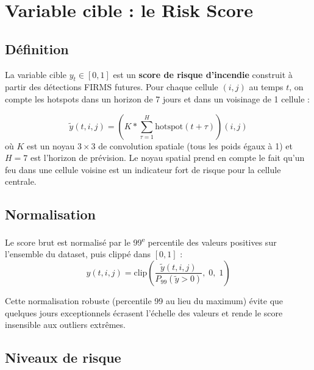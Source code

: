 \documentclass[12pt,a4paper]{report}
\begin{document}
\section{Variable cible : le Risk Score}

\subsection{Définition}

La variable cible $y_t \in [0, 1]$ est un \textbf{score de risque d'incendie} construit
à partir des détections FIRMS futures. Pour chaque cellule $(i, j)$ au temps $t$, on
compte les hotspots dans un horizon de 7 jours et dans un voisinage de 1 cellule :

\begin{equation}
  \tilde{y}(t, i, j) = \left(K * \sum_{\tau=1}^{H} \text{hotspot}(t+\tau)\right)(i, j)
  \label{eq:risk_raw}
\end{equation}
où $K$ est un noyau $3 \times 3$ de convolution spatiale (tous les poids égaux à 1) et
$H = 7$ est l'horizon de prévision. Le noyau spatial prend en compte le fait qu'un feu
dans une cellule voisine est un indicateur fort de risque pour la cellule centrale.

\subsection{Normalisation}

Le score brut est normalisé par le 99\textsuperscript{e} percentile des valeurs positives
sur l'ensemble du dataset, puis clippé dans $[0, 1]$ :
\begin{equation}
  y(t, i, j) = \text{clip}\!\left(\frac{\tilde{y}(t, i, j)}{P_{99}(\tilde{y} > 0)},\; 0,\; 1\right)
  \label{eq:risk_norm}
\end{equation}

Cette normalisation robuste (percentile 99 au lieu du maximum) évite que quelques jours
exceptionnels écrasent l'échelle des valeurs et rende le score insensible aux outliers
extrêmes.

\subsection{Niveaux de risque}
\end{document}

